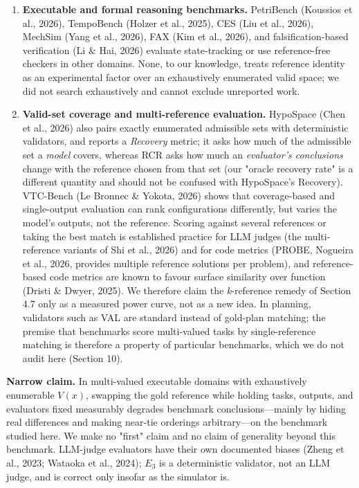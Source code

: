 \documentclass[11pt]{article}
\begin{document}
\begin{enumerate}
\item \textbf{Executable and formal reasoning benchmarks.} PetriBench (Koussios et al., 2026), TempoBench (Holzer et al., 2025), CES (Liu et al., 2026), MechSim (Yang et al., 2026), FAX (Kim et al., 2026), and falsification-based verification (Li \& Hai, 2026) evaluate state-tracking or use reference-free checkers in other domains. None, to our knowledge, treats reference identity as an experimental factor over an exhaustively enumerated valid space; we did not search exhaustively and cannot exclude unreported work.
\item \textbf{Valid-set coverage and multi-reference evaluation.} HypoSpace (Chen et al., 2026) also pairs exactly enumerated admissible sets with deterministic validators, and reports a \emph{Recovery} metric; it asks how much of the admissible set a \emph{model} covers, whereas RCR asks how much an \emph{evaluator's conclusions} change with the reference chosen from that set (our "oracle recovery rate" is a different quantity and should not be confused with HypoSpace's Recovery). VTC-Bench (Le Bronnec \& Yokota, 2026) shows that coverage-based and single-output evaluation can rank configurations differently, but varies the model's outputs, not the reference. Scoring against several references or taking the best match is established practice for LLM judges (the multi-reference variants of Shi et al., 2026) and for code metrics (PROBE, Nogueira et al., 2026, provides multiple reference solutions per problem), and reference-based code metrics are known to favour surface similarity over function (Dristi \& Dwyer, 2025). We therefore claim the \emph{k}-reference remedy of Section 4.7 only as a measured power curve, not as a new idea. In planning, validators such as VAL are standard instead of gold-plan matching; the premise that benchmarks score multi-valued tasks by single-reference matching is therefore a property of particular benchmarks, which we do not audit here (Section 10).
\end{enumerate}
\textbf{Narrow claim.} In multi-valued executable domains with exhaustively enumerable $V(x)$, swapping the gold reference while holding tasks, outputs, and evaluators fixed measurably degrades benchmark conclusions---mainly by hiding real differences and making near-tie orderings arbitrary---on the benchmark studied here. We make no "first" claim and no claim of generality beyond this benchmark. LLM-judge evaluators have their own documented biases (Zheng et al., 2023; Wataoka et al., 2024); $E_3$ is a deterministic validator, not an LLM judge, and is correct only insofar as the simulator is.
\end{document}
